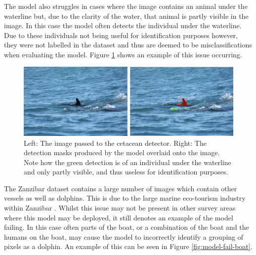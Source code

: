 The model also struggles in cases where the image contains an animal under the waterline but, due to the clarity of the water, that animal is partly visible in the image. In this case the model often detects the individual under the waterline. Due to these individuals not being useful for identification purposes however, they were not labelled in the dataset and thus are deemed to be misclassifications when evaluating the model. Figure \ref{fig:model-fail-underwater} shows an example of this issue occurring.

\begin{figure}[h]
	\begin{center}
		\includegraphics[scale=0.6]{Chapter3/figs/model-fail-underwater.png}
	\end{center}
	\caption[Left: The image passed to the cetacean detector. Right: The detection masks produced by the model overlaid onto the image.]{Left: The image passed to the cetacean detector. Right: The detection masks produced by the model overlaid onto the image. Note how the green detection is of an individual under the waterline and only partly visible, and thus useless for identification purposes. }
	\label{fig:model-fail-underwater}
\end{figure}

The Zanzibar dataset contains a large number of images which contain other vessels as well as dolphins. This is due to the large marine eco-tourism industry within Zanzibar \cite{sharpe_indian_2019, berggren_sustainable_2007}. Whilst this issue may not be present in other survey areas where this model may be deployed, it still denotes an example of the model failing. In this case often parts of the boat, or a combination of the boat and the humans on the boat, may cause the model to incorrectly identify a grouping of pixels as a dolphin. An example of this can be seen in Figure \ref{fig:model-fail-boat}.
 
